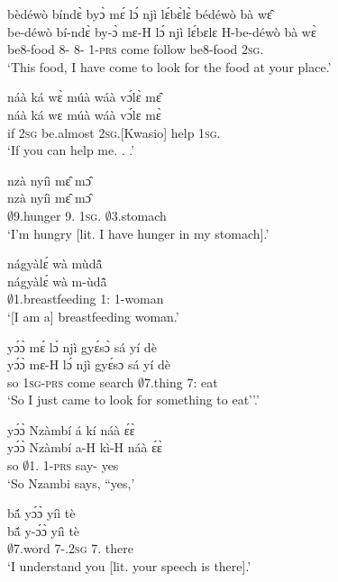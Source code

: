 \begin{exe}[(N234)]
\exN\label{n41}
  \glll bèdéwò bíndɛ̀ byɔ̀ mɛ́ lɔ́ njì lɛ́bɛ̀lɛ̀ bédéwò bà wɛ̂\\
        be-déwò bí-ndɛ̀ by-ɔ̀ mɛ-H lɔ́ njì lɛ́bɛlɛ H-be-déwò bà wɛ̀\\
           be8-food 8-{\ANA} 8-{\OBJ} 1-\textsc{prs} {\RETRO}  come  follow be8-food {\AP} 2\textsc{sg}.{\OBJ}\\
    \trans `This food, I have come to look for the food at your place.'
 
\exN\label{n42}
  \glll  náà ká wɛ̀ múà wáà vɔ́lɛ̀ mɛ̂ \\
        náà ká wɛ múà wáà vɔ́lɛ mɛ̀ \\
          {\COMP} if 2\textsc{sg} be.almost 2\textsc{sg}.{\FUT}[Kwasio] help 1\textsc{sg}.{\OBJ} \\
    \trans `If you can help me. . .'
 
\exN\label{n43}
  \glll  nzà nyíì mɛ̂ mɔ̂ \\
          nzà nyíì mɛ̂ mɔ̂ \\
           $\emptyset$9.hunger 9.{\COP} 1\textsc{sg}.{\OBJ} $\emptyset$3.stomach  \\
    \trans `I'm hungry [lit. I have hunger in my stomach].'
 
\exN\label{n44}
  \glll nágyàlɛ́ wà mùdã̂ \\
        nágyàlɛ́ wà m-ùdã̂ \\
           $\emptyset$1.breastfeeding 1:{\ATT}  {\N}1-woman \\
    \trans `[I am a] breastfeeding woman.'
 
\exN\label{n45}
  \glll yɔ́ɔ̀ mɛ́ lɔ́ njì gyɛ́sɔ̀ sá yí dè \\
       yɔ́ɔ̀ mɛ-H lɔ́ njì gyɛ́sɔ sá yí dè \\
         so 1\textsc{sg}-\textsc{prs} {\RETRO}  come search $\emptyset$7.thing 7:{\ATT}  eat    \\
    \trans `So I just came to look for something to eat''.'
 
\exN\label{n46}
  \glll  yɔ́ɔ̀ Nzàmbí á kí náà ɛ́ɛ̀ \\
         yɔ́ɔ̀ Nzàmbí a-H kì-H náà ɛ́ɛ̀ \\
          so $\emptyset$1.{\PN} 1-\textsc{prs} say-{\R} {\COMP} yes \\
    \trans `So Nzambi says, ``yes,'
 
\exN\label{n47}
  \glll bã́ yɔ́ɔ̀ yíì tè \\
        bã́ y-ɔ́ɔ̀ yíì tè \\
         $\emptyset$7.word 7-{\POSS}.2\textsc{sg}  7.{\COP} there \\
    \trans `I understand you [lit. your speech is there].'
 

\end{exe}
